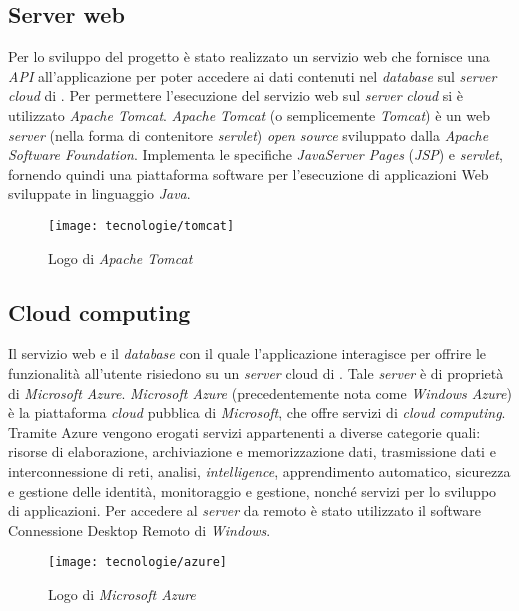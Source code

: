 \newpage

\subsection{Server web}

Per lo sviluppo del progetto è stato realizzato un servizio web che fornisce una \textit{API} all'applicazione per poter accedere ai dati contenuti nel \textit{database} sul \textit{server} \textit{cloud} di \visione{}. Per permettere l'esecuzione del servizio web sul \textit{server} \textit{cloud} si è utilizzato \textit{Apache Tomcat}. \textit{Apache Tomcat} (o semplicemente \textit{Tomcat}) è un web \textit{server} (nella forma di contenitore \textit{servlet}) \textit{open source} sviluppato dalla \textit{Apache Software Foundation}. Implementa le specifiche \textit{JavaServer Pages} (\textit{JSP}) e \textit{servlet}, fornendo quindi una piattaforma software per l'esecuzione di applicazioni Web sviluppate in linguaggio \textit{Java}.

\begin{figure}[!h] 
    \centering 
    \texttt{[image: tecnologie/tomcat]} 
    \caption{Logo di \textit{Apache Tomcat}}
\end{figure}

\subsection{Cloud computing}

Il servizio web e il \textit{database} con il quale l'applicazione interagisce per offrire le funzionalità all'utente risiedono su un \textit{server} cloud di \visione{}. Tale \textit{server} è di proprietà di \textit{Microsoft Azure}. \textit{Microsoft Azure} (precedentemente nota come \textit{Windows Azure}) è la piattaforma \textit{cloud} pubblica di \textit{Microsoft}, che offre servizi di \textit{cloud computing}. Tramite Azure vengono erogati servizi appartenenti a diverse categorie quali: risorse di elaborazione, archiviazione e memorizzazione dati, trasmissione dati e interconnessione di reti, analisi, \textit{intelligence}, apprendimento automatico, sicurezza e gestione delle identità, monitoraggio e gestione, nonché servizi per lo sviluppo di applicazioni. Per accedere al \textit{server} da remoto è stato utilizzato il software Connessione Desktop Remoto di \textit{Windows}.

\begin{figure}[!h] 
    \centering 
    \texttt{[image: tecnologie/azure]} 
    \caption{Logo di \textit{Microsoft Azure}}
\end{figure}

